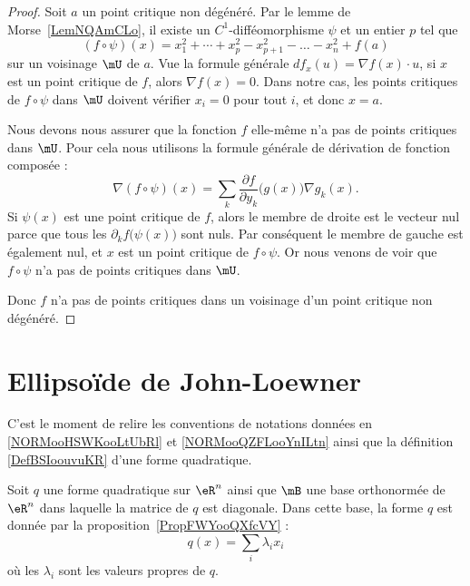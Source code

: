 \begin{proof}
    Soit \( a\) un point critique non dégénéré. Par le lemme de Morse~\ref{LemNQAmCLo}, il existe un \( C^1\)-difféomorphisme \( \psi\) et un entier \( p\) tel que
    \begin{equation}
        (f\circ \psi)(x)=x_1^2+\cdots +x_p^2-x_{p+1}^2-\ldots -x_n^2+f(a)
    \end{equation}
    sur un voisinage \( \mU\) de \( a\). Vue la formule générale \( df_x(u)=\nabla f(x)\cdot u\), si \( x\) est un point critique de \( f\), alors \( \nabla f(x)=0\). Dans notre cas, les points critiques de \( f\circ \psi\) dans \( \mU\) doivent vérifier \( x_i=0\) pour tout \( i\), et donc \( x=a\).

    Nous devons nous assurer que la fonction \( f\) elle-même n'a pas de points critiques dans \( \mU\). Pour cela nous utilisons la formule générale de dérivation de fonction composée :
    \begin{equation}
        \nabla(f\circ\psi)(x)=\sum_k \frac{ \partial f }{ \partial y_k }\big( g(x) \big)\nabla g_k(x).
    \end{equation}
    Si \( \psi(x)\) est une point critique de \( f\), alors le membre de droite est le vecteur nul parce que tous les \( \partial_kf\big( \psi(x) \big)\) sont nuls. Par conséquent le membre de gauche est également nul, et \( x\) est un point critique de \( f\circ\psi\). Or nous venons de voir que \( f\circ\psi\) n'a pas de points critiques dans \( \mU\).

    Donc \( f\) n'a pas de points critiques dans un voisinage d'un point critique non dégénéré.
\end{proof}

\section{Ellipsoïde de John-Loewner}

C'est le moment de relire les conventions de notations données en \ref{NORMooHSWKooLtUbRl} et \ref{NORMooQZFLooYnILtn} ainsi que la définition \ref{DefBSIoouvuKR} d'une forme quadratique.

Soit \( q\) une forme quadratique sur \( \eR^n\) ainsi que \( \mB\) une base orthonormée de \( \eR^n\) dans laquelle la matrice de  \( q\) est diagonale. Dans cette base, la forme \( q\) est donnée par la proposition~\ref{PropFWYooQXfcVY} :
\begin{equation}
    q(x)=\sum_i\lambda_ix_i
\end{equation}
où les \( \lambda_i\) sont les valeurs propres de \( q\).

